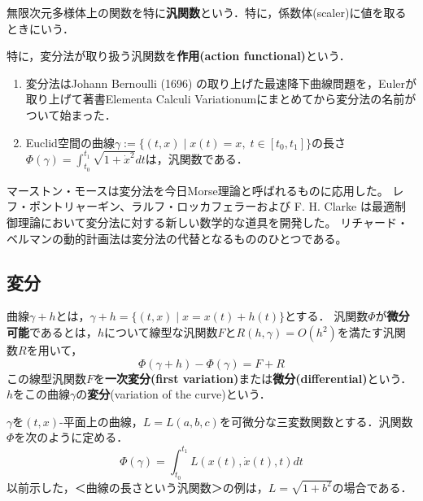 \documentclass[uplatex,dvipdfmx]{jsreport}
\begin{document}
\begin{definition}[functional]
    無限次元多様体上の関数を特に\textbf{汎関数}という．特に，係数体(scaler)に値を取るときにいう．

    特に，変分法が取り扱う汎関数を\textbf{作用(action functional)}という．
\end{definition}
\begin{example}[汎関数の例]\mbox{}
    \begin{enumerate}
        \item 変分法はJohann Bernoulli (1696) の取り上げた最速降下曲線問題を，Eulerが取り上げて著書Elementa Calculi Variationumにまとめてから変分法の名前がついて始まった．
        \item Euclid空間の曲線$\gamma:=\{(t,x)\mid x(t)=x,\; t\in[t_0,t_1]\}$の長さ$\Phi(\gamma)=\int^{t_1}_{t_0}\sqrt{1+\dot{x}^2}dt$は，汎関数である．
    \end{enumerate}
\end{example}
\begin{history}
    マーストン・モースは変分法を今日Morse理論と呼ばれるものに応用した。
    レフ・ポントリャーギン、ラルフ・ロッカフェラーおよび F. H. Clarke は最適制御理論において変分法に対する新しい数学的な道具を開発した。
    リチャード・ベルマンの動的計画法は変分法の代替となるもののひとつである。
\end{history}

\subsection{変分}

\begin{definition}
    曲線$\gamma+h$とは，$\gamma+h=\{(t,x)\mid x=x(t)+h(t)\}$とする．
    汎関数$\Phi$が\textbf{微分可能}であるとは，$h$について線型な汎関数$F$と$R(h,\gamma)=O(h^2)$を満たす汎関数$R$を用いて，
    \[ \Phi(\gamma+h)-\Phi(\gamma) = F+R \]
    この線型汎関数$F$を\textbf{一次変分(first variation)}または\textbf{微分(differential)}という．$h$をこの曲線$\gamma$の\textbf{変分}(variation of the curve)という．
\end{definition}
\begin{example}
    $\gamma$を$(t,x)$-平面上の曲線，$L=L(a,b,c)$を可微分な三変数関数とする．汎関数$\Phi$を次のように定める．
    \[ \Phi(\gamma) = \int^{t_1}_{t_0}L(x(t),\dot{x}(t),t)dt \]
    以前示した，＜曲線の長さという汎関数＞の例は，$L=\sqrt{1+b^2}$の場合である．
\end{example}
\end{document}
